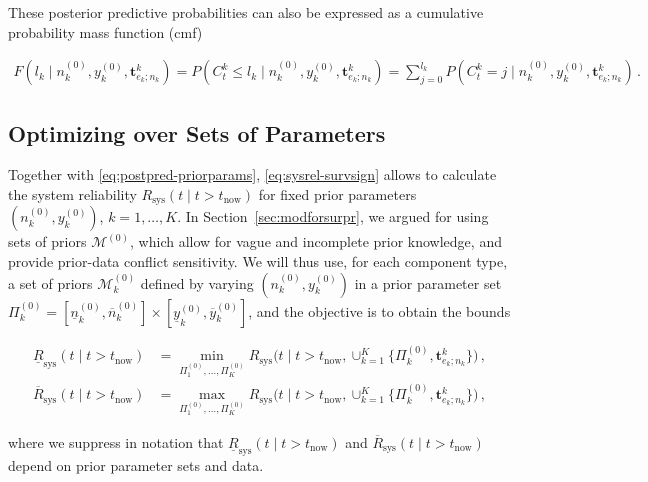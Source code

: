 \documentclass[Journal,SectionNumbers,InsideFigs]{ascelike}
\renewcommand{\vec}[1]{{\bm#1}}
\newcommand{\uz}{^{(0)}} %
\newcommand{\un}{^{(n)}} %
\newcommand{\ul}[1]{\underline{#1}}
\newcommand{\ol}[1]{\overline{#1}}
\newcommand{\Rsys}{R_\text{sys}}
\newcommand{\lRsys}{\ul{R}_\text{sys}}
\newcommand{\uRsys}{\ol{R}_\text{sys}}
\def\Rsys{R_\text{sys}}
\def\ykz{y\uz_k}
\def\ykzl{\ul{y}\uz_k}
\def\ykzu{\ol{y}\uz_k}
\def\nkz{n\uz_k}
\def\nkn{n\un_k}
\def\nkzl{\ul{n}\uz_k}
\def\nkzu{\ol{n}\uz_k}
\def\MZ{\mathcal{M}\uz}
\def\MkZ{\mathcal{M}\uz_k}
\def\PkZ{\Pi\uz_k}
\newcommand{\PZi}[1]{\Pi\uz_{#1}}
\def\tnow{t_\text{now}}
\begin{document}
%
These posterior predictive probabilities can also be expressed as a cumulative probability mass function (cmf) 
\begin{linenomath*}
\begin{align}
F(l_k \mid \nkz,\ykz,\vec{t}^k_{e_k;n_k}) = P(C^k_t \leq l_k \mid \nkz,\ykz,\vec{t}^k_{e_k;n_k}) 
 = \sum_{j=0}^{l_k} P(C^k_t = j \mid \nkz,\ykz,\vec{t}^k_{e_k;n_k})\,.
\end{align}
\end{linenomath*}


\subsection{Optimizing over Sets of Parameters}
\label{sec:optimize}

Together with \eqref{eq:postpred-priorparams},
\eqref{eq:sysrel-survsign} allows to calculate the system reliability $\Rsys(t\mid t>\tnow)$
for fixed prior parameters $(\nkz, \ykz)$, $k=1, \ldots, K$.
In Section~\ref{sec:modforsurpr}, we argued for using sets of priors $\MZ$,
which allow for vague and incomplete prior knowledge, and provide prior-data conflict sensitivity.
%
We will thus use, for each component type,
a set of priors $\MkZ$ defined by varying $(\nkz,\ykz)$ in a prior parameter set $\PkZ = [\nkzl,\nkzu] \times [\ykzl,\ykzu]$,
and the objective is to obtain the bounds
\begin{linenomath*}
\begin{align}
\lRsys(t \mid t > \tnow) &= \min_{\PZi{1},\ldots,\PZi{K}} \Rsys\big(t \mid t > \tnow, \cup_{k=1}^K \{\PkZ, \vec{t}^k_{e_k;n_k}\}\big)\,,
\label{eq:lrsysdef}\\
\uRsys(t \mid t > \tnow) &= \max_{\PZi{1},\ldots,\PZi{K}} \Rsys\big(t \mid t > \tnow, \cup_{k=1}^K \{\PkZ, \vec{t}^k_{e_k;n_k}\}\big)\,,
\label{eq:ursysdef}
\end{align}
\end{linenomath*}
where we suppress in notation that $\lRsys(t \mid t > \tnow)$ and $\uRsys(t \mid t > \tnow)$
depend on prior parameter sets and data.
\end{document}
